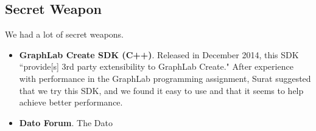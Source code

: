 \subsection{Secret Weapon}

We had a lot of secret weapons. 

\begin{itemize}
\item \textbf{GraphLab Create SDK (C++)}.  Released in December 2014, this SDK ``provide[s] 3rd party extensibility to GraphLab Create."  After experience with performance in the GraphLab programming assignment, Surat suggested that we try this SDK, and we found it easy to use and that it seems to help achieve better performance.

\item \textbf{Dato Forum}.  The Dato
\end{itemize}
